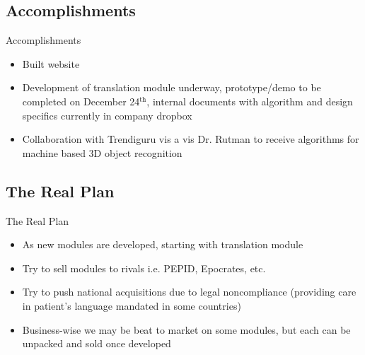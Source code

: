 \documentclass[presentation]{beamer}
\begin{document}
\subsection{Accomplishments}
\label{sec-1-8}
\begin{frame}[label=sec-1-8-1]{Accomplishments}
\begin{itemize}
\item Built website
\item Development of translation module underway, prototype/demo to be
completed on December 24$^{\text{th}}$, internal documents with algorithm and
design specifics currently in company dropbox
\item Collaboration with Trendiguru vis a vis Dr. Rutman to receive
algorithms for machine based 3D object recognition
\end{itemize}
\end{frame}

\subsection{The Real Plan}
\label{sec-1-9}
\begin{frame}[label=sec-1-9-1]{The Real Plan}
\begin{itemize}
\item As new modules are developed, starting with translation module
\item Try to sell modules to rivals i.e. PEPID, Epocrates, etc.
\item Try to push national acquisitions due to legal noncompliance
(providing care in patient's language mandated in some countries)
\item Business-wise we may be beat to market on some modules, but each can
be unpacked and sold once developed
\end{itemize}
\end{frame}
\end{document}
